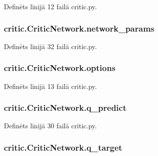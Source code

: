 Definēts līnijā 12 failā critic.\+py.

\subsubsection[{\texorpdfstring{network\+\_\+params}{network_params}}]{\setlength{\rightskip}{0pt plus 5cm}critic.\+Critic\+Network.\+network\+\_\+params}\hypertarget{classcritic_1_1_critic_network_a033abaa32fa20baf9d2faaa6a2c6fae3}{}\label{classcritic_1_1_critic_network_a033abaa32fa20baf9d2faaa6a2c6fae3}


Definēts līnijā 32 failā critic.\+py.

\subsubsection[{\texorpdfstring{options}{options}}]{\setlength{\rightskip}{0pt plus 5cm}critic.\+Critic\+Network.\+options}\hypertarget{classcritic_1_1_critic_network_a14fa3b43d18dc2e8e5ca3fcd617b8bcc}{}\label{classcritic_1_1_critic_network_a14fa3b43d18dc2e8e5ca3fcd617b8bcc}


Definēts līnijā 13 failā critic.\+py.

\subsubsection[{\texorpdfstring{q\+\_\+predict}{q_predict}}]{\setlength{\rightskip}{0pt plus 5cm}critic.\+Critic\+Network.\+q\+\_\+predict}\hypertarget{classcritic_1_1_critic_network_a5c8a5c7b27312a19cd603216db6e5b52}{}\label{classcritic_1_1_critic_network_a5c8a5c7b27312a19cd603216db6e5b52}


Definēts līnijā 30 failā critic.\+py.

\subsubsection[{\texorpdfstring{q\+\_\+target}{q_target}}]{\setlength{\rightskip}{0pt plus 5cm}critic.\+Critic\+Network.\+q\+\_\+target}\hypertarget{classcritic_1_1_critic_network_acae4004c3e447aaadc7f25ee2a550f60}{}\label{classcritic_1_1_critic_network_acae4004c3e447aaadc7f25ee2a550f60}


